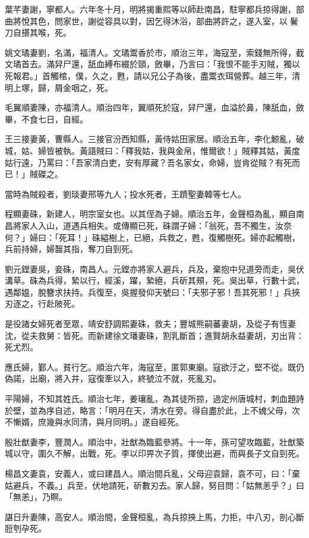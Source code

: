 \begin{pinyinscope}
葉芊妻謝，寧都人。六年冬十月，明將揭重熙等以師赴南昌，駐寧都兵掠得謝，部曲將悅其色，問家世，謝從容具以對，因乞得沐浴，部曲將許之，遂入室，以鬢刀自揕其喉，死。

姚文璚妻劉，名滿，福清人。文璚鬻香於市，順治三年，海寇至，索錢無所得，截文璚首去。滿舁尸還，舐血縛布綴於頸，斂畢，乃言曰：「我恨不能手刃賊，獨以死報君。」首觸棺，僕，久之，甦，請以兄公子為後，盡鬻衣珥營葬。越三年，清明上塚，歸，屑金咽之，死。

毛翼順妻陳，亦福清人。順治四年，翼順死於寇，舁尸還，血溢於鼻，陳舐血，斂畢，不食七日，自經。

王三接妻黃，曹縣人。三接官汾西知縣，黃侍姑田家居。順治五年，李化鯨亂，破城，姑、婦皆被執。黃語賊曰：「釋我姑，我與金帛，惟爾欲！」賊釋其姑，黃度姑行遠，乃罵曰：「吾家清白吏，安有厚藏？吾名家女，命婦，豈肯從賊？有死而已！」賊磔之。

當時為賊殺者，劉琰妻邢等九人；投水死者，王躋聖妻韓等七人。

程顯妻硃，新建人，明宗室女也。以其侄為子婦。順治五年，金聲桓為亂，顯自南昌將家人入山，道遇兵相失。或傳顯已死，硃謂子婦：「翁死，吾不獨生，汝奈何？」婦曰：「死耳！」硃縊樹上，已絕，兵救之，甦，復觸樹死。婦亦起觸樹，兵前持婦，婦齧其指，奪刀自剄死。

劉元鏜妻吳，妾硃，南昌人。元鏜亦將家人避兵，兵及，棄抱中兒道旁而走，吳伏溝草。硃為兵得，縶以行，經溪，躍，縶絕，兵斫其頰，死。吳出草，行數十武，遇鄰媼，脫簪求扶持。兵復至，吳握發仰天號曰：「夫邪子邪！吾其死邪！」兵挾刃逐之，行赴陂死。

是役諸女婦死者至眾，靖安舒調熙妻硃，救夫；豐城熊嗣蕃妻胡，及從子有恆妻沈，從夫救舅：皆死。而新建徐文璠妻硃，割乳斷首；進賢胡永益妻胡，刃出背：死尤烈。

應氏婦，鄞人。貧行乞。順治六年，海寇至，匿郭東廟。寇欲汙之，堅不從。既仍偽諾，出廟，將入井，寇復牽以入，終號泣不就，死亂刃。

平陽婦，不知其姓氏。順治七年，姜瓖亂，為其徒所掠，過定州唐城村，刺血題詩於壁，並為序自述，略言：「明月在天，清水在旁。得自盡於此，上不媿父母，次不慚婿，庶幾與水同清，與月同明。」遂自經死。

殷壯猷妻李，豐潤人。順治中，壯猷為臨藍參將。十一年，孫可望攻臨藍，壯猷築城以守，圍久不解，出戰，死。李以印畀次子質，揮使出避，而與長子文自剄死。

楊昌文妻袁，安義人，或曰建昌人。順治間兵亂，父母迎袁歸，袁不可，曰：「棄姑避兵，不義。」兵至，伏地請死，斫數刃去。家人歸，努目問：「姑無恙乎？」曰「無恙」，乃瞑。

諶日升妻陳，高安人。順治間，金聲桓亂，為兵掠挾上馬，力拒，中八刃，剖心斷脰刳孕死。


\end{pinyinscope}
